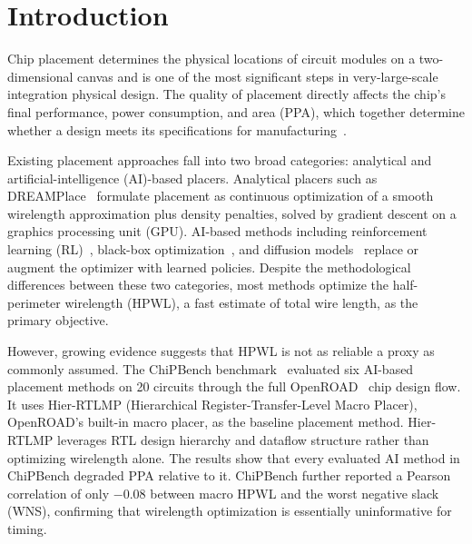 \documentclass[sigconf,anonymous,review,9pt]{acmart}
\begin{document}

\maketitle

\section{Introduction}
\label{sec:intro}

Chip placement determines the physical locations of circuit modules on a
two-dimensional canvas and is one of the most significant steps in very-large-scale integration physical design. The quality of placement directly affects the
chip's final performance, power consumption, and area (PPA), which
together determine whether a design meets its specifications for manufacturing~\cite{kahng2022vlsi}.

Existing placement approaches fall into two broad categories: analytical and artificial-intelligence (AI)-based placers. Analytical
placers such as DREAMPlace~\cite{lin2019dreamplace} formulate placement
as continuous optimization of a smooth wirelength approximation plus
density penalties, solved by gradient descent on a graphics processing unit (GPU). AI-based methods
including reinforcement
learning (RL)~\cite{mirhoseini2021graph, lai2022maskplace, lai2023chipformer},
black-box optimization~\cite{shi2023wire}, and diffusion
models~\cite{lee2024chip} replace or augment the optimizer with learned
policies. Despite the methodological differences between these two categories, most methods optimize the half-perimeter wirelength (HPWL), a fast estimate of total wire length, as the primary objective.

However, growing evidence suggests that HPWL is not as reliable a proxy as commonly assumed. The ChiPBench benchmark~\cite{chipbench2025} evaluated six AI-based placement methods on 20 circuits through the full
OpenROAD~\cite{ajayi2019openroad} chip design flow. It uses
Hier-RTLMP (Hierarchical Register-Transfer-Level Macro Placer), OpenROAD's built-in macro placer, as the baseline placement method. Hier-RTLMP leverages RTL design hierarchy and dataflow
structure rather than optimizing wirelength alone. The results show that every evaluated AI
method in ChiPBench degraded PPA relative to it. ChiPBench further reported a Pearson
correlation of only $-0.08$ between macro HPWL and the worst negative slack
(WNS), confirming that wirelength optimization is essentially
uninformative for timing.
\end{document}
